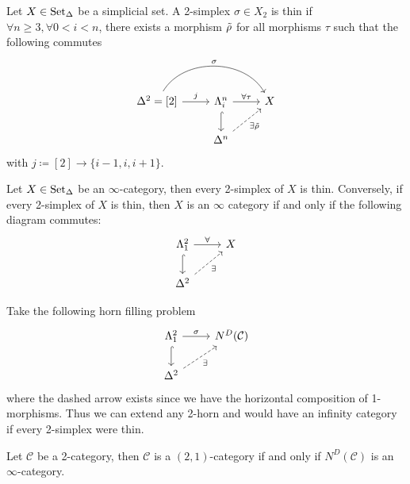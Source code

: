 \begin{defi}
\label{thin_defi}
	Let $ X \in \operatorname{Set}_{\Delta} $ be a simplicial set. 
	A 2-simplex $ \sigma \in X_2 $ is thin if $ \forall n \geq 3, \forall 0 < i < n $, there exists 
	a morphism $ \Tilde{ \rho } $ for all morphisms $ \tau $ such that the following commutes
	\[
	\begin{tikzcd}
		\Delta^2 = [ 2 ] 
		\ar[r, " j "]
		\ar[rr, bend left = 60, " \sigma "]
		&
		\Lambda_i^n
		\ar[r, " \forall \tau"]
		\ar[d, hook]
		&
		X
		\\
		&
		\Delta^n 
		\ar[ru, dashed, "\exists \Tilde{\rho}"']
	\end{tikzcd}
	\] 	
	with $ j \coloneqq [ 2 ] \to \{ i -1 , i , i + 1 \} $.
\end{defi}

\begin{rmk}
\label{every_simplex_thin}
	Let $ X \in \operatorname{Set}_{\Delta} $ be an $ \infty $-category, then every 2-simplex of $ X $ is thin.
	Conversely, if every 2-simplex of $ X $ is thin, then $ X $ is an $ \infty $ category if and only if the following diagram commutes:
	\[
	\begin{tikzcd}
		\Lambda_1^2 
		\ar[r, " \forall"]
		\ar[d, hook]
		&
		X
		\\
		\Delta^2
		\ar[ru, dashed, "\exists"']
	\end{tikzcd}
	\]
\end{rmk}

\begin{rmk}
\label{remark_thin_Duskin}
	Take the following horn filling problem
	\[
	\begin{tikzcd}
		\Lambda_1^2
		\ar[r, " \sigma "]
		\ar[d, hook]
		&
		N^D ( \mathcal{ C } )
		\\
		\Delta^2
		\ar[ru, dashed, "\exists"']
	\end{tikzcd}
	\]
	where the dashed arrow exists since we have the horizontal composition of 1-morphisms.
	Thus we can extend any 2-horn and would have an infinity category if every 2-simplex were thin.
\end{rmk}

\begin{thm}
	Let $ \mathcal{ C } $ be a 2-category, then $ \mathcal{ C } $ is a $ ( 2 , 1 ) $-category if and only if $ N^D ( \mathcal{ C } ) $ is an $ \infty $-category.
\end{thm}

